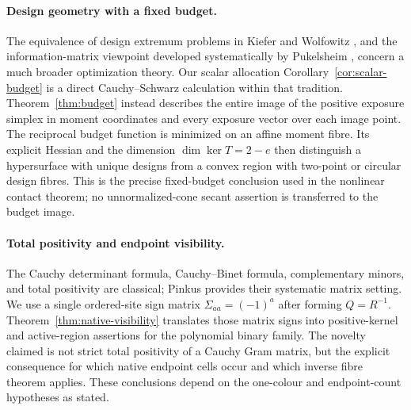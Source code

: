 \paragraph{Design geometry with a fixed budget.}
The equivalence of design extremum problems in Kiefer and Wolfowitz \cite{KW}, and the information-matrix viewpoint developed systematically by Pukelsheim \cite{Pukelsheim}, concern a much broader optimization theory. Our scalar allocation Corollary~\ref{cor:scalar-budget} is a direct Cauchy--Schwarz calculation within that tradition. Theorem~\ref{thm:budget} instead describes the entire image of the positive exposure simplex in moment coordinates and every exposure vector over each image point. The reciprocal budget function is minimized on an affine moment fibre. Its explicit Hessian and the dimension $\dim\ker T=2-e$ then distinguish a hypersurface with unique designs from a convex region with two-point or circular design fibres. This is the precise fixed-budget conclusion used in the nonlinear contact theorem; no unnormalized-cone secant assertion is transferred to the budget image.

\paragraph{Total positivity and endpoint visibility.}
The Cauchy determinant formula, Cauchy--Binet formula, complementary minors, and total positivity are classical; Pinkus \cite{Pinkus} provides their systematic matrix setting. We use a single ordered-site sign matrix $\Sigma_{aa}=(-1)^a$ after forming $Q=R^{-1}$. Theorem~\ref{thm:native-visibility} translates those matrix signs into positive-kernel and active-region assertions for the polynomial binary family. The novelty claimed is not strict total positivity of a Cauchy Gram matrix, but the explicit consequence for which native endpoint cells occur and which inverse fibre theorem applies. These conclusions depend on the one-colour and endpoint-count hypotheses as stated.

